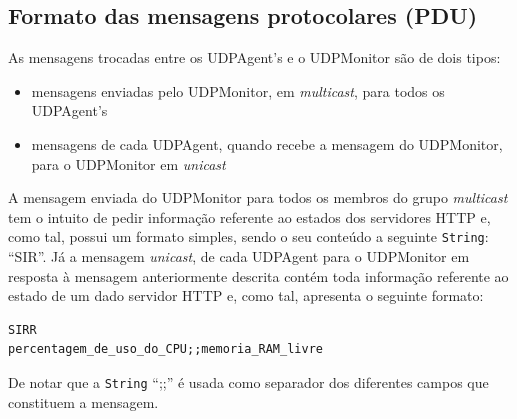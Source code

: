 \documentclass{article}
\begin{document}
\subsection{Formato das mensagens protocolares (PDU)}
As mensagens trocadas entre os UDPAgent's e o UDPMonitor são de dois tipos: 
\begin{itemize}
    \item mensagens enviadas pelo UDPMonitor, em \textit{multicast}, para todos os UDPAgent's
    \item mensagens de cada UDPAgent, quando recebe a mensagem do UDPMonitor, para o UDPMonitor em \textit{unicast}
\end{itemize}

A mensagem enviada do UDPMonitor para todos os membros do grupo \textit{multicast} tem o intuito de pedir informação referente ao estados dos servidores HTTP e, como tal, possui um formato simples, sendo o seu conteúdo a seguinte \texttt{String}: ``SIR''.
Já a mensagem \textit{unicast}, de cada UDPAgent para o UDPMonitor em resposta à mensagem anteriormente descrita contém toda informação referente ao estado de um dado servidor HTTP e, como tal, apresenta o seguinte formato:
\begin{verbatim}
SIRR
percentagem_de_uso_do_CPU;;memoria_RAM_livre
\end{verbatim}
De notar que a \texttt{String} ``;;'' é usada como separador dos diferentes campos que constituem a mensagem. 
\end{document}
